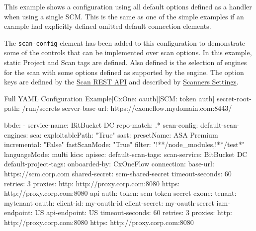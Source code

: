 This example shows a \cxoneflow configuration using all default options defined
as a handler when using a single SCM.  This is the same as one of the simple examples if
an example had explicitly defined omitted default connection elements.

The \texttt{scan-config} element has been added to this configuration to
demonstrate some of the controls that can be implemented over scan options.  In this
example, static Project and Scan tags are defined.  Also defined is the selection
of engines for the scan with some options defined as supported by the engine.  The
option keys are defined by the
\href{https://checkmarx.stoplight.io/docs/checkmarx-one-api-reference-guide/branches/main/f601dd9456e80-run-a-scan}{Scan REST API}
and described by
\href{https://checkmarx.com/resource/documents/en/34965-68598-global-settings.html#UUID-8e38f06b-45d4-ea7f-5ff5-50deb22e43aa_UUID-1a4211ec-dbf9-a180-cb20-59e1246ec3fb}{Scanners Settings}.


\begin{code}{Full YAML Configuration Example}{[CxOne: oauth]}{[SCM: token auth]}
secret-root-path: /run/secrets
server-base-url: https://cxoneflow.mydomain.com:8443/

bbdc:
    - service-name: BitBucket DC
      repo-match: .*
      scan-config:
          default-scan-engines:
              sca:
                  exploitablePath: "True"
              sast:
                  presetName: ASA Premium
                  incremental: "False"
                  fastScanMode: "True"
                  filter: "!**/node_modules,!**/test*"
                  languageMode: multi
              kics:
              apisec:
          default-scan-tags:
              scan-service: BitBucket DC
          default-project-tags:
              onboarded-by: CxOneFlow
      connection:
          base-url: https://scm.corp.com
          shared-secret: scm-shared-secret
          timeout-seconds: 60
          retries: 3
          proxies:
            http: http://proxy.corp.com:8080
            https: http://proxy.corp.com:8080
          api-auth:
              token: scm-token-secret
      cxone:
          tenant: mytenant
          oauth:
              client-id: my-oauth-id
              client-secret: my-oauth-secret
          iam-endpoint: US
          api-endpoint: US
          timeout-seconds: 60
          retries: 3
          proxies:
            http: http://proxy.corp.com:8080
            https: http://proxy.corp.com:8080
\end{code}

